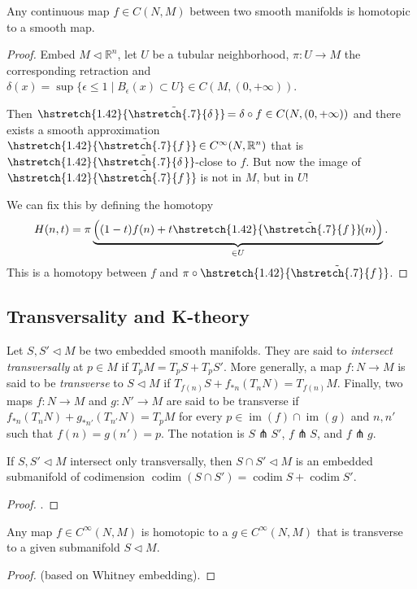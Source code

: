 \documentclass[english,letterpaper]{article}%
\numberwithin{equation}{section}
\numberwithin{figure}{section}
\numberwithin{table}{section}
\theoremstyle{definition}
\theoremstyle{definition}
\theoremstyle{definition}
\theoremstyle{plain}
\theoremstyle{plain}
\theoremstyle{plain}
\theoremstyle{plain}
\theoremstyle{remark}
\theoremstyle{remark}
\renewcommand{\leq}{\leqslant}
\DeclareMathOperator{\im}{im}
\DeclareMathOperator{\codim}{codim}
\newcommand{\sub}{\vartriangleleft}
\newcommand\wt[1]{\hstretch{1.42}{\tilde{\hstretch{.7}{#1\mkern2mu}}}\mkern-2mu}
\begin{document}
\begin{thm}
Any continuous map $f\in C(N,M)$ between two smooth manifolds is homotopic to a smooth map.
\end{thm}
\begin{proof}
Embed $M\sub \mathbb{R}^n$, let $U$ be a tubular neighborhood, $\pi:U\to M$ the corresponding retraction and $\delta(x)=\sup \{\epsilon\leq 1\mid B_\epsilon (x)\subset U\}\in C(M,(0,+\infty))$. 

Then $\wt{\delta}=\delta\circ f\in C(N,(0,+\infty))$ and there exists a smooth approximation $\wt{f}\in C^\infty(N,\mathbb{R}^n)$ that is $\wt{\delta}$-close to $f$. But now the image of $\wt{f}$ is not in $M$, but in $U$!

We can fix this by defining the homotopy \[H(n,t)=\pi\underbrace{\left((1-t)f(n)+t\wt{f}(n)\right)}_{\in U}.\] This is a homotopy between $f$ and $\pi\circ\wt{f}$.
\end{proof}


\subsection{Transversality and K-theory}

\begin{defn}[Transversality]
Let $S,S'\sub M$ be two embedded smooth manifolds. They are said to \emph{intersect transversally} at $p\in M$ if $T_p M=T_p S+ T_p S'$. More generally, a map $f:N\to M$ is said to be \emph{transverse} to $S\sub M$ if $T_{f(n)}S+f_{\ast n}(T_n N)=T_{f(n)}M$. Finally, two maps $f:N\to M$ and $g:N'\to M$ are said to be transverse if $f_{\ast n}(T_nN)+g_{\ast n'}(T_{n'}N)=T_p M$ for every $p\in\im(f)\cap\im(g)$ and $n,n'$ such that $f(n)=g(n')=p$. The notation is $S\pitchfork S'$, $f\pitchfork S$, and $f\pitchfork g$.
\end{defn}
\begin{thm}
If $S,S'\sub M$ intersect only transversally, then $S\cap S'\sub M$ is an embedded submanifold of codimension  $\codim(S\cap S')=\codim S+\codim S'$.
\end{thm}
\begin{proof}
\cite[Thm. 6.30]{Lee}.
\end{proof}

\begin{thm}\label{transverse homotopy thm}
Any map $f\in C^\infty(N,M)$ is homotopic to a $g\in C^\infty(N,M)$ that is transverse to a given submanifold $S\sub M$.
\end{thm}
\begin{proof}
\cite[Thm. 6.36]{Lee} (based on Whitney embedding).
\end{proof}
\end{document}
